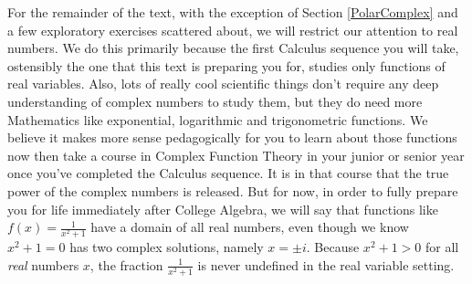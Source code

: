 For the remainder of the text, with the exception of Section \ref{PolarComplex} and a few exploratory exercises scattered about, we will restrict our attention to real numbers.  We do this primarily because the first Calculus sequence you will take, ostensibly the one that this text is preparing you for, studies only functions of real variables.  Also, lots of really cool scientific things don't require any deep understanding of complex numbers to study them, but they do need more Mathematics like exponential, logarithmic and trigonometric functions.  We believe it makes more sense pedagogically for you to learn about those functions now then take a course in Complex Function Theory in your junior or senior year once you've completed the Calculus sequence.  It is in that course that the true power of the complex numbers is released.  But for now, in order to fully prepare you for life immediately after College Algebra, we will say that functions like $f(x) = \frac{1}{x^{2} + 1}$ have a domain of all real numbers, even though we know $x^{2} + 1 = 0$ has two complex solutions, namely $x = \pm i$.  Because $x^{2} + 1 > 0$ for all \emph{real} numbers $x$, the fraction $\frac{1}{x^{2} + 1}$ is never undefined in the real variable setting.

